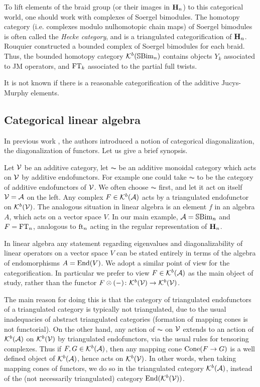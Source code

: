 To lift elements of the braid group (or their images in ${\mathbf H}_n$) to this categorical world, one should work with complexes of Soergel bimodules. The homotopy category (i.e. complexes
modulo nulhomotopic chain maps) of Soergel bimodules is often called the \emph{Hecke category}, and is a triangulated categorification of ${\mathbf H}_n$. Rouquier constructed a bounded
complex of Soergel bimodules for each braid. Thus, the bounded homotopy category ${\mathcal{K}}^b({\mathbb{S}}{\rm Bim }_n)$ contains objects $Y_k$ associated to JM operators, and $\operatorname{FT}_k$ associated to the
partial full twists.


\begin{remark} It is not known if there is a reasonable categorification of the additive Jucys-Murphy elements. \end{remark}

\subsection{Categorical linear algebra}

In previous work \cite{ElHog17a}, the authors introduced a notion of categorical diagonalization, the diagonalization of functors. Let us give a brief synopsis.


Let ${\mathcal{V}}$ be an additive category, let $\AC$ be an additive monoidal category which acts on ${\mathcal{V}}$ by additive endofunctors. For example one could take $\AC$ to be the category of
additive endofunctors of ${\mathcal{V}}$. We often choose $\AC$ first, and let it act on itself ${\mathcal{V}}={\mathcal{A}}$ on the left. Any complex $F \in {\mathcal{K}}^b({\mathcal{A}})$ acts by a triangulated endofunctor on
${\mathcal{K}}^b({\mathcal{V}})$. The analogous situation in linear algebra is an element $f$ in an algebra $A$, which acts on a vector space $V$. In our main example, ${\mathcal{A}} = {\mathbb{S}}{\rm Bim }_n$ and $F = \operatorname{FT}_n$,
analogous to $\operatorname{ft}_n$ acting in the regular representation of ${\mathbf H}_n$.


\begin{remark} In linear algebra any statement regarding eigenvalues and diagonalizability of linear operators on a vector space $V$ can be stated entirely in terms of the algebra of endomorphisms $A=\operatorname{End}(V)$.  We adopt a similar point of view for the categorification.  In particular we prefer to view $F\in {\mathcal{K}}^b({\mathcal{A}})$ as the main object of study, rather than the functor $F\otimes(-) \colon {\mathcal{K}}^b({\mathcal{V}}) \rightarrow {\mathcal{K}}^b({\mathcal{V}})$.

The main reason for doing this is that the category of triangulated endofunctors of a triangulated category is typically not triangulated, due to the usual inadequacies of abstract triangulated categories (formation of mapping cones is not functorial).   On the other hand, any action of $\AC$ on ${\mathcal{V}}$ extends to an action of ${\mathcal{K}}^b({\mathcal{A}})$ on ${\mathcal{K}}^b({\mathcal{V}})$ by triangulated endofunctors, via the usual rules for tensoring complexes.  Thus if $F,G\in {\mathcal{K}}^b({\mathcal{A}})$, then any mapping cone $\operatorname{Cone}(F\rightarrow G)$ is a well defined object of ${\mathcal{K}}^b({\mathcal{A}})$, hence acts on ${\mathcal{K}}^b({\mathcal{V}})$.  In other words, when taking mapping cones of functors, we do so in the triangulated category ${\mathcal{K}}^b({\mathcal{A}})$, instead of the (not necessarily triangulated) category $\operatorname{End}({\mathcal{K}}^b({\mathcal{V}}))$. \end{remark}

